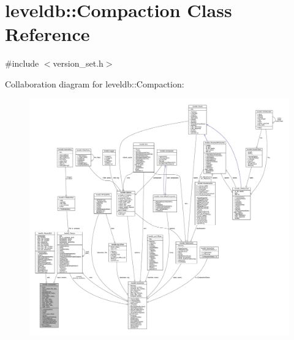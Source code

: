 \hypertarget{classleveldb_1_1_compaction}{}\section{leveldb\+:\+:Compaction Class Reference}
\label{classleveldb_1_1_compaction}


{\ttfamily \#include $<$version\+\_\+set.\+h$>$}



Collaboration diagram for leveldb\+:\+:Compaction\+:
\nopagebreak
\begin{figure}[H]
\begin{center}
\leavevmode
\includegraphics[width=350pt]{classleveldb_1_1_compaction__coll__graph}
\end{center}
\end{figure}
